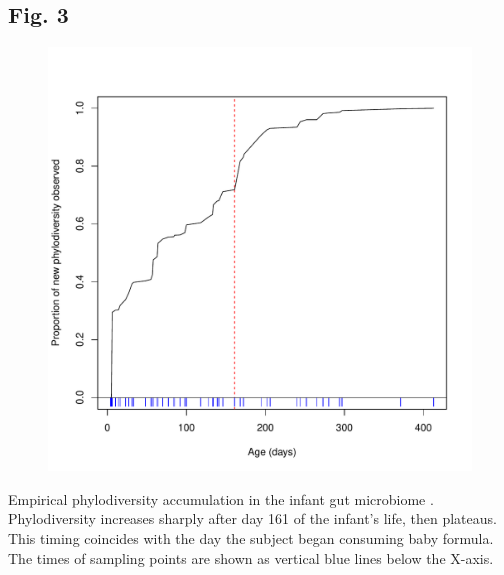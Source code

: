 \documentclass{article}
\begin{document}
{\subsection{Fig. 3}\label{sec:figure3}
\begin{figure}[ht]
	\centering
	\includegraphics[scale=0.80]{figs/Fig_3.pdf}
\end{figure}
Empirical phylodiversity accumulation in the infant gut microbiome \cite{Koenig2011}. Phylodiversity increases sharply after day 161 of the infant’s life, then plateaus. This timing coincides with the day the subject began consuming baby formula. The times of sampling points are shown as vertical blue lines below the X-axis.
\newpage

}
\end{document}
